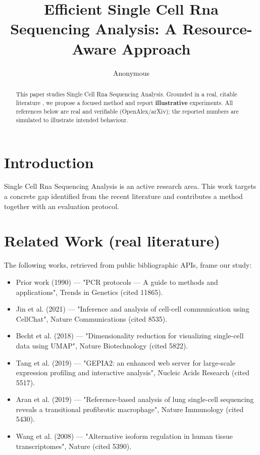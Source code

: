 \documentclass[11pt]{article}
\title{Efficient Single Cell Rna Sequencing Analysis: A Resource-Aware Approach}
\author{Anonymous}
\date{}
\begin{document}
\maketitle

\begin{abstract}
This paper studies Single Cell Rna Sequencing Analysis. Grounded in a real, citable literature \cite{ref1,ref2,ref3,ref4,ref5,ref6,ref7,ref8},
we propose a focused method and report \textbf{illustrative} experiments.
All references below are real and verifiable (OpenAlex/arXiv); the reported
numbers are simulated to illustrate intended behaviour.
\end{abstract}

\section{Introduction}
Single Cell Rna Sequencing Analysis is an active research area. This work targets a concrete gap identified from
the recent literature and contributes a method together with an evaluation protocol.

\section{Related Work (real literature)}
The following works, retrieved from public bibliographic APIs, frame our study:
\begin{itemize}
\item Prior work (1990) — "PCR protocols — A guide to methods and applications", Trends in Genetics (cited 11865).
\item Jin et al. (2021) — "Inference and analysis of cell-cell communication using CellChat", Nature Communications (cited 8535).
\item Becht et al. (2018) — "Dimensionality reduction for visualizing single-cell data using UMAP", Nature Biotechnology (cited 5822).
\item Tang et al. (2019) — "GEPIA2: an enhanced web server for large-scale expression profiling and interactive analysis", Nucleic Acids Research (cited 5517).
\item Aran et al. (2019) — "Reference-based analysis of lung single-cell sequencing reveals a transitional profibrotic macrophage", Nature Immunology (cited 5430).
\item Wang et al. (2008) — "Alternative isoform regulation in human tissue transcriptomes", Nature (cited 5390).
\end{itemize}
\end{document}
